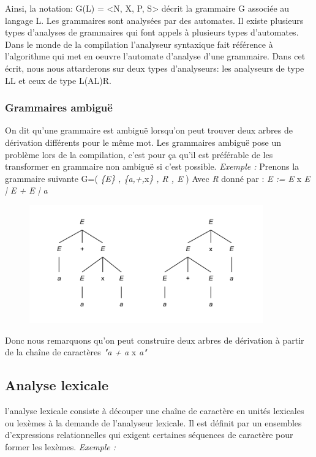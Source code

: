 \documentclass{article}
\begin{document}
Ainsi, la notation: G(L) = <N, X, P, S> décrit la grammaire G associée au langage L.
Les grammaires sont analysées par des automates. Il existe plusieurs types d’analyses de grammaires qui font appels à plusieurs types d’automates.
Dans le monde de la compilation l’analyseur syntaxique fait référence à l’algorithme qui met en oeuvre l’automate d’analyse d’une grammaire.
Dans cet écrit, nous nous attarderons sur deux types d’analyseurs: les analyseurs de type LL et ceux de type L(AL)R.

\subsubsection{Grammaires ambiguë}
On dit qu’une grammaire est ambiguë  lorsqu’on peut trouver deux arbres de dérivation différents pour le même mot.
Les grammaires ambiguë pose un problème lors de la compilation, c’est pour ça qu’il est préférable de les transformer en grammaire non ambiguë si c’est possible.\newline
\textit{Exemple : }\newline\newline
Prenons la grammaire suivante G=( \textit{\{E\} , \{a,+,}x\textit{\} , R , E} ) \newline
Avec \textit{R} donné par : \textit{E := E} x \textit{E | E + E | a}


\begin{figure}[h]
	\centering
		\includegraphics[width=0.90\textwidth]{grammaireAmbigue.png}
	\label{fig:grammaireAmbigue}
\end{figure}\FloatBarrier

Donc nous remarquons qu'on peut construire deux arbres de dérivation à partir de la chaîne de caractères 
\textit{"a + a} x \textit{a"} 

\subsection{Analyse lexicale}
l’analyse lexicale consiste à découper une chaîne de caractère en unités lexicales ou lexèmes à la demande de l’analyseur lexicale.
Il est définit par un ensembles d’expressions relationnelles qui exigent certaines séquences de caractère pour former les lexèmes.
\textit{Exemple :}
\end{document}
